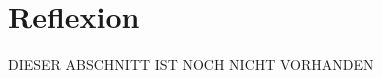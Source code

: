 \chapter{Reflexion}
\authortoc{\dario}{\chapterident}
DIESER ABSCHNITT IST NOCH NICHT VORHANDEN
\newline
\newline
\lipsum[4-8][32-64]